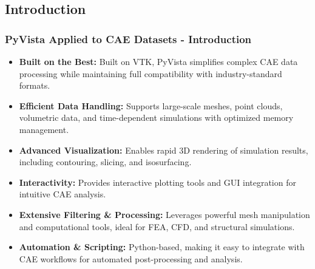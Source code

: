 \documentclass[t]{beamer}
\begin{document}
\subsection{Introduction}
\begin{frame}

    \frametitle{PyVista Applied to CAE Datasets - Introduction}

    \begin{itemize}[leftmargin=10pt, label=•]
        \item \textbf{Built on the Best:} Built on VTK, PyVista simplifies complex CAE data processing while maintaining full compatibility with industry-standard formats.
        \item \textbf{Efficient Data Handling:} Supports large-scale meshes, point clouds, volumetric data, and time-dependent simulations with optimized memory management.
        \item \textbf{Advanced Visualization:} Enables rapid 3D rendering of simulation results, including contouring, slicing, and isosurfacing.
        \item \textbf{Interactivity:} Provides interactive plotting tools and GUI integration for intuitive CAE analysis.
        \item \textbf{Extensive Filtering \& Processing:} Leverages powerful mesh manipulation and computational tools, ideal for FEA, CFD, and structural simulations.
        \item \textbf{Automation \& Scripting:} Python-based, making it easy to integrate with CAE workflows for automated post-processing and analysis.
    \end{itemize}

\end{frame}
\end{document}
